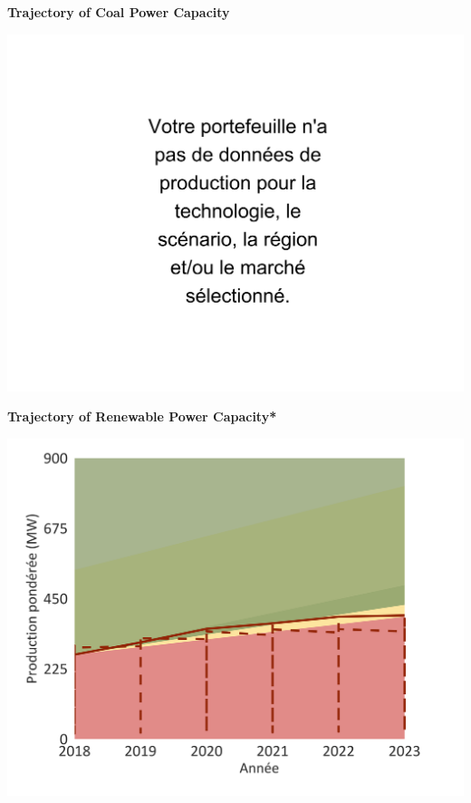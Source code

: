 \documentclass[10pt,table]{article}\usepackage[]{graphicx}\usepackage[]{color}
\begin{document}
	\begin{minipage}[t]{.49\linewidth}
		\textbf{Trajectory of Coal Power Capacity }

		\includegraphics[trim = {0 0cm 0 0},width=1\linewidth]{ReportOutputs/Fig17}

		\textbf{Trajectory of Renewable Power Capacity* }

		\includegraphics[trim = {0 0cm 0 0},width=.99\linewidth]{ReportOutputs/Fig18}
	\end{minipage}	
	\hspace{.02\linewidth}
\end{document}
